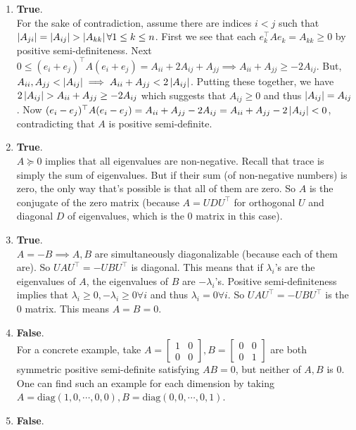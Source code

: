 \begin{enumerate}[leftmargin=*, label=(\alph*)]
\item \textbf{True}.\\
For the sake of contradiction, assume there are indices $i< j$ such that $\abs{A_{ji}}=\abs{A_{ij}}>\abs{A_{kk}}\forall 1\leq k\leq n$. First we see that each $e_k^\top Ae_k = A_{kk}\geq 0$ by positive semi-definiteness. Next $0\leq (e_i+e_j)^\top A (e_i+e_j) = A_{ii} + 2A_{ij} + A_{jj}\implies A_{ii}+ A_{jj} \ge-2A_{ij}$. But, $A_{ii}, A_{jj} < \left| A_{ij} \right|\implies A_{ii}+A_{jj} < 2 \left| A_{ij} \right|$. Putting these together, we have $2\left| A_{ij} \right| > A_{ii} + A_{jj} \ge -2A_{ij}$ which suggests that $A_{ij}\ge 0$ and thus $\left| A_{ij} \right|=A_{ij}$. Now $(e_i-e_j)^\top A(e_i-e_j) = A_{ii} + A_{jj} - 2A_{ij} = A_{ii} + A_{jj} - 2\left| A_{ij} \right| < 0$, contradicting that $A$ is positive semi-definite.
\item \textbf{True}.\\
$A\succeq 0$ implies that all eigenvalues are non-negative. Recall that trace is simply the sum of eigenvalues. But if their sum (of non-negative numbers) is zero, the only way that's possible is that all of them are zero. So $A$ is the conjugate of the zero matrix (because $A = UDU^\top$ for orthogonal $U$ and diagonal $D$ of eigenvalues, which is the $0$ matrix in this case).
\item \textbf{True}.\\
$A=-B\implies A,B$ are simultaneously diagonalizable (because each of them are). So $UAU^\top = -UBU^\top$ is diagonal. This means that if $\lambda_i$'s are the eigenvalues of $A$, the eigenvalues of $B$ are $-\lambda_i$'s. Positive semi-definiteness implies that $\lambda_i\geq 0, -\lambda_i\geq 0\forall i$ and thus $\lambda_i = 0\forall i$. So $UAU^\top = -UBU^\top$ is the $0$ matrix. This means $A=B=0$.
\item \textbf{False}.\\
For a concrete example, take $A = \begin{bmatrix}1&0\\0&0\end{bmatrix}, B = \begin{bmatrix}0&0\\0&1\end{bmatrix}$ are both symmetric positive semi-definite satisfying $AB=0$, but neither of $A,B$ is $0$. One can find such an example for each dimension by taking $A=\text{diag}(1,0,\cdots,0,0), B=\text{diag}(0,0,\cdots,0,1)$.
\item \textbf{False}.\\

\end{enumerate}
